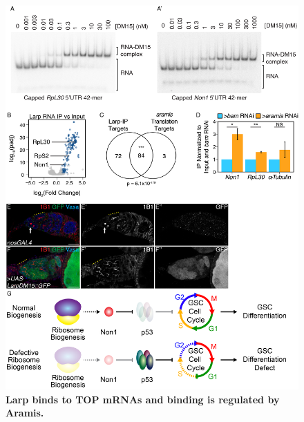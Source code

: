 \documentclass[12pt,oneside]{reedthesis}
\begin{document}
\begin{figure}

{\centering \includegraphics[width=6.5 in,height=8.9375 in]{./figure/Ribosome Biogenesis/Ribosome Biogenesis 7} 

}

\caption[\textbf{Larp binds to TOP mRNAs and binding is regulated by Aramis.}]{\textbf{Larp binds to TOP mRNAs and binding is regulated by Aramis.}}\label{fig:unnamed-chunk-13}
\end{figure}
\end{document}
